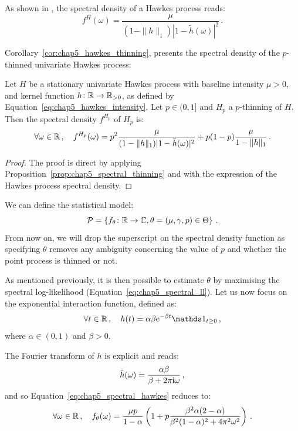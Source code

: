     As shown in \textcite{Hawkes1971}, the spectral density of a Hawkes process reads:
    \[f^H(\omega) = \frac{\mu}{(1-\|h\|_1)|1-\tilde h(\omega)|^2}\,.\]

    Corollary~\ref{cor:chap5_hawkes_thinning}, presents the spectral density of the $p$-thinned univariate Hawkes process:

    \begin{corollary}\label{cor:chap5_hawkes_thinning}
        Let $H$ be a stationary univariate Hawkes process with baseline intensity $\mu > 0$, and kernel function $h\colon {\mathbb R}\to {\mathbb R}_{>0}$,
        as defined by Equation~\eqref{eq:chap5_hawkes_intensity}. Let $p\in(0,1]$ and $H_p$ a $p$-thinning of $H$. 
        Then the spectral density $f^{H_p}$ of $H_p$ is:
        \begin{equation}\label{eq:chap5_spectral_hawkes}
            \forall \omega \in {\mathbb R}\,, \quad f^{H_p}(\omega) = p^2 \frac{\mu}{(1-\|h\|_1)|1-\tilde h(\omega)|^2} + p(1-p)\frac{\mu}{1-\|h\|_1}\,.
        \end{equation}
    \end{corollary}
    \begin{proof}
        The proof is direct by applying Proposition~\ref{prop:chap5_spectral_thinning} and 
        with the expression of the Hawkes process spectral density.
    \end{proof}
    We can define the statistical model:
    \[\mathcal{P} = 
      \left\{
        f_\theta \colon {\mathbb R} \to {\mathbb C}, \theta = (\mu, \gamma, p) \in \Theta
      \right\}\,.
    \]
    From now on, we will drop the superscript on the spectral density function as specifying $\theta$ removes any ambiguity concerning the value of $p$ and whether the point process is thinned or not.

    As mentioned previously, it is then possible to estimate $\theta$ by maximising the spectral log-likelihood (Equation~\eqref{eq:chap5_spectral_ll}).
    Let us now focus on the exponential interaction function, defined as:
    \[\forall t\in\RR\,,\quad h(t) = \alpha \beta \mathrm{e}^{-\beta t}\II_{t\geq 0}\,,\]
    where $\alpha \in(0,1)$ and $\beta > 0$.

    The Fourier transform of $h$ is explicit and reads:
    \[\tilde h (\omega) = \frac{\alpha \beta}{\beta + 2 \pi \mathrm{i} \omega}\,,\]
    and so Equation~\eqref{eq:chap5_spectral_hawkes} reduces to:
    \begin{equation}\label{eq:chap5_spectral_exponential}
        \forall \omega\in{\mathbb R}\,,\quad
        f_{\theta}(\omega) = \frac{\mu p }{1-\alpha}\left(1 + p \frac{\beta^2 \alpha (2-\alpha)}{\beta^2(1-\alpha)^2 + 4 \pi^2 \omega^2}\right)\,.
    \end{equation}


